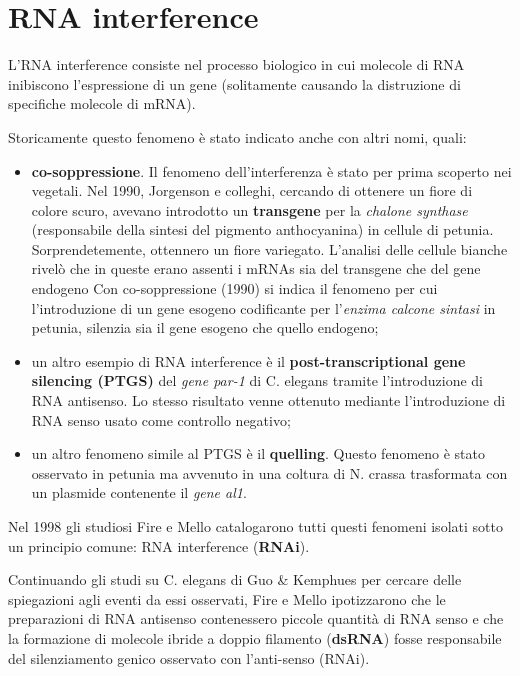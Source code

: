 \documentclass[]{article}
\begin{document}
\section{RNA interference}\label{rna-interference}

L'RNA interference consiste nel processo biologico in cui molecole di
RNA inibiscono l'espressione di un gene (solitamente causando la
distruzione di specifiche molecole di mRNA).

Storicamente questo fenomeno è stato indicato anche con altri nomi,
quali:

\begin{itemize}
\itemsep1pt\parskip0pt
\item
  \textbf{co-soppressione}. Il fenomeno dell'interferenza è stato per
  prima scoperto nei vegetali. Nel 1990, Jorgenson e colleghi, cercando
  di ottenere un fiore di colore scuro, avevano introdotto un
  \textbf{transgene} per la \emph{chalone synthase} (responsabile della
  sintesi del pigmento anthocyanina) in cellule di petunia.
  Sorprendetemente, ottennero un fiore variegato. L'analisi delle
  cellule bianche rivelò che in queste erano assenti i mRNAs sia del
  transgene che del gene endogeno Con co-soppressione (1990) si indica
  il fenomeno per cui l'introduzione di un gene esogeno codificante per
  l'\emph{enzima calcone sintasi} in petunia, silenzia sia il gene
  esogeno che quello endogeno;
\item
  un altro esempio di RNA interference è il \textbf{post-transcriptional
  gene silencing (PTGS)} del \emph{gene par-1} di C. elegans tramite
  l'introduzione di RNA antisenso. Lo stesso risultato venne ottenuto
  mediante l'introduzione di RNA senso usato come controllo negativo;
\item
  un altro fenomeno simile al PTGS è il \textbf{quelling}. Questo
  fenomeno è stato osservato in petunia ma avvenuto in una coltura di N.
  crassa trasformata con un plasmide contenente il \emph{gene al1}.
\end{itemize}

Nel 1998 gli studiosi Fire e Mello catalogarono tutti questi fenomeni
isolati sotto un principio comune: RNA interference (\textbf{RNAi}).

Continuando gli studi su C. elegans di Guo \& Kemphues per cercare delle
spiegazioni agli eventi da essi osservati, Fire e Mello ipotizzarono che
le preparazioni di RNA antisenso contenessero piccole quantità di RNA
senso e che la formazione di molecole ibride a doppio filamento
(\textbf{dsRNA}) fosse responsabile del silenziamento genico osservato
con l'anti-senso (RNAi).
\end{document}
